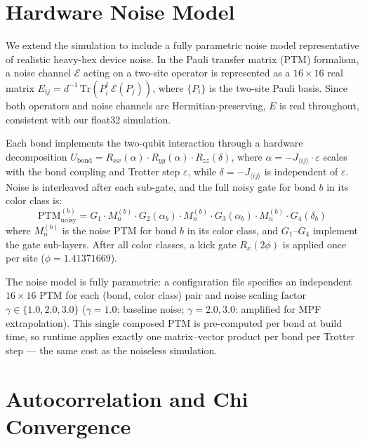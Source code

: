 \documentclass[12pt]{article}
\begin{document}
\section{Hardware Noise Model}
\label{sec:noise}

We extend the simulation to include a fully parametric noise model
representative of realistic heavy-hex device noise. In the Pauli transfer matrix (PTM) formalism, a noise channel $\mathcal{E}$
acting on a two-site operator is represented as a $16\times16$ real matrix
$E_{ij} = d^{-1}\,\mathrm{Tr}(P_i^\dagger\,\mathcal{E}(P_j))$,
where $\{P_i\}$ is the two-site Pauli basis.
Since both operators and noise channels are Hermitian-preserving, $E$ is real
throughout, consistent with our float32 simulation.

Each bond implements the two-qubit interaction through a hardware decomposition
$U_{\mathrm{bond}} = R_{xx}(\alpha)\cdot R_{yy}(\alpha)\cdot R_{zz}(\delta)$,
where $\alpha = -J_{\langle ij\rangle}\cdot\varepsilon$ scales with the bond coupling
and Trotter step $\varepsilon$, while $\delta = -J_{\langle ij\rangle}$ is
independent of $\varepsilon$.
Noise is interleaved after each sub-gate, and the full noisy gate for bond $b$
in its color class is:
\begin{equation}
    \mathrm{PTM}_{\mathrm{noisy}}^{(b)} =
    G_1 \cdot M_n^{(b)} \cdot G_2(\alpha_b) \cdot M_n^{(b)}
    \cdot G_3(\alpha_b) \cdot M_n^{(b)} \cdot G_4(\delta_b)
\end{equation}
where $M_n^{(b)}$ is the noise PTM for bond $b$ in its color class,
and $G_1$--$G_4$ implement the gate sub-layers.
After all color classes, a kick gate $R_x(2\phi)$ is applied once per site
($\phi = 1.41371669$).

The noise model is fully parametric: a configuration file specifies
an independent $16\times16$ PTM for each (bond, color class) pair and noise
scaling factor $\gamma \in \{1.0, 2.0, 3.0\}$ ($\gamma=1.0$: baseline noise;
$\gamma=2.0, 3.0$: amplified for MPF extrapolation).
This single composed PTM is pre-computed per bond at build time,
so runtime applies exactly one matrix--vector product per bond per Trotter step —
the same cost as the noiseless simulation.


\section{Autocorrelation and Chi Convergence}
\label{sec:ct}
\end{document}

